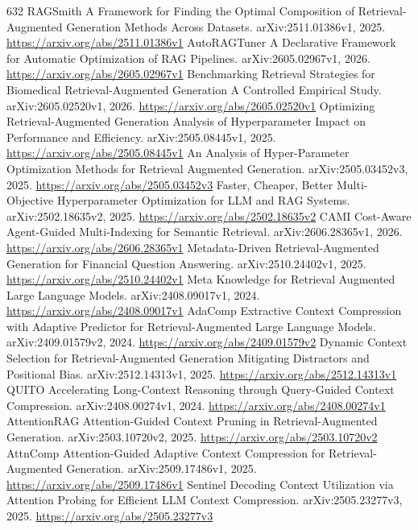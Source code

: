 \documentclass[11pt]{article}
\begin{document}
\begin{thebibliography}{632}
 RAGSmith A Framework for Finding the Optimal Composition of Retrieval-Augmented Generation Methods Across Datasets. arXiv:2511.01386v1, 2025. \url{https://arxiv.org/abs/2511.01386v1}
 AutoRAGTuner A Declarative Framework for Automatic Optimization of RAG Pipelines. arXiv:2605.02967v1, 2026. \url{https://arxiv.org/abs/2605.02967v1}
 Benchmarking Retrieval Strategies for Biomedical Retrieval-Augmented Generation A Controlled Empirical Study. arXiv:2605.02520v1, 2026. \url{https://arxiv.org/abs/2605.02520v1}
 Optimizing Retrieval-Augmented Generation Analysis of Hyperparameter Impact on Performance and Efficiency. arXiv:2505.08445v1, 2025. \url{https://arxiv.org/abs/2505.08445v1}
 An Analysis of Hyper-Parameter Optimization Methods for Retrieval Augmented Generation. arXiv:2505.03452v3, 2025. \url{https://arxiv.org/abs/2505.03452v3}
 Faster, Cheaper, Better Multi-Objective Hyperparameter Optimization for LLM and RAG Systems. arXiv:2502.18635v2, 2025. \url{https://arxiv.org/abs/2502.18635v2}
 CAMI Cost-Aware Agent-Guided Multi-Indexing for Semantic Retrieval. arXiv:2606.28365v1, 2026. \url{https://arxiv.org/abs/2606.28365v1}
 Metadata-Driven Retrieval-Augmented Generation for Financial Question Answering. arXiv:2510.24402v1, 2025. \url{https://arxiv.org/abs/2510.24402v1}
 Meta Knowledge for Retrieval Augmented Large Language Models. arXiv:2408.09017v1, 2024. \url{https://arxiv.org/abs/2408.09017v1}
 AdaComp Extractive Context Compression with Adaptive Predictor for Retrieval-Augmented Large Language Models. arXiv:2409.01579v2, 2024. \url{https://arxiv.org/abs/2409.01579v2}
 Dynamic Context Selection for Retrieval-Augmented Generation Mitigating Distractors and Positional Bias. arXiv:2512.14313v1, 2025. \url{https://arxiv.org/abs/2512.14313v1}
 QUITO Accelerating Long-Context Reasoning through Query-Guided Context Compression. arXiv:2408.00274v1, 2024. \url{https://arxiv.org/abs/2408.00274v1}
 AttentionRAG Attention-Guided Context Pruning in Retrieval-Augmented Generation. arXiv:2503.10720v2, 2025. \url{https://arxiv.org/abs/2503.10720v2}
 AttnComp Attention-Guided Adaptive Context Compression for Retrieval-Augmented Generation. arXiv:2509.17486v1, 2025. \url{https://arxiv.org/abs/2509.17486v1}
 Sentinel Decoding Context Utilization via Attention Probing for Efficient LLM Context Compression. arXiv:2505.23277v3, 2025. \url{https://arxiv.org/abs/2505.23277v3}

\end{thebibliography}
\end{document}
